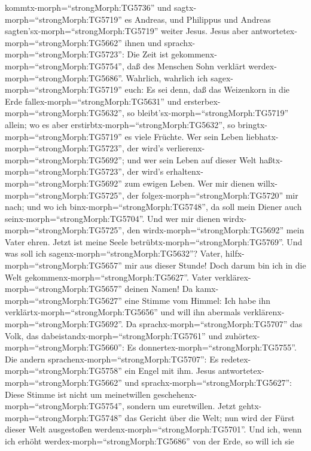 kommtx-morph=``strongMorph:TG5736'' und
sagtx-morph=``strongMorph:TG5719'' es Andreas, und Philippus und Andreas
sagten'sx-morph=``strongMorph:TG5719'' weiter Jesus.  Jesus
aber antwortetex-morph=``strongMorph:TG5662'' ihnen und
sprachx-morph=``strongMorph:TG5723'': Die Zeit ist
gekommenx-morph=``strongMorph:TG5754'', daß des Menschen Sohn verklärt
werdex-morph=``strongMorph:TG5686''.  Wahrlich, wahrlich
ich sagex-morph=``strongMorph:TG5719'' euch: Es sei denn, daß das
Weizenkorn in die Erde fallex-morph=``strongMorph:TG5631'' und
ersterbex-morph=``strongMorph:TG5632'', so
bleibt'sx-morph=``strongMorph:TG5719'' allein; wo es aber
erstirbtx-morph=``strongMorph:TG5632'', so
bringtx-morph=``strongMorph:TG5719'' es viele Früchte.  Wer
sein Leben liebhatx-morph=``strongMorph:TG5723'', der wird's
verlierenx-morph=``strongMorph:TG5692''; und wer sein Leben auf dieser
Welt haßtx-morph=``strongMorph:TG5723'', der wird's
erhaltenx-morph=``strongMorph:TG5692'' zum ewigen Leben. 
Wer mir dienen willx-morph=``strongMorph:TG5725'', der
folgex-morph=``strongMorph:TG5720'' mir nach; und wo ich
binx-morph=``strongMorph:TG5748'', da soll mein Diener auch
seinx-morph=``strongMorph:TG5704''. Und wer mir dienen
wirdx-morph=``strongMorph:TG5725'', den
wirdx-morph=``strongMorph:TG5692'' mein Vater ehren.  Jetzt
ist meine Seele betrübtx-morph=``strongMorph:TG5769''. Und was soll ich
sagenx-morph=``strongMorph:TG5632''? Vater,
hilfx-morph=``strongMorph:TG5657'' mir aus dieser Stunde! Doch darum bin
ich in die Welt gekommenx-morph=``strongMorph:TG5627''. 
Vater verklärex-morph=``strongMorph:TG5657'' deinen Namen! Da
kamx-morph=``strongMorph:TG5627'' eine Stimme vom Himmel: Ich habe ihn
verklärtx-morph=``strongMorph:TG5656'' und will ihn abermals
verklärenx-morph=``strongMorph:TG5692''.  Da
sprachx-morph=``strongMorph:TG5707'' das Volk, das
dabeistandx-morph=``strongMorph:TG5761'' und
zuhörtex-morph=``strongMorph:TG5660'': Es
donnertex-morph=``strongMorph:TG5755''. Die andern
sprachenx-morph=``strongMorph:TG5707'': Es
redetex-morph=``strongMorph:TG5758'' ein Engel mit ihm. 
Jesus antwortetex-morph=``strongMorph:TG5662'' und
sprachx-morph=``strongMorph:TG5627'': Diese Stimme ist nicht um
meinetwillen geschehenx-morph=``strongMorph:TG5754'', sondern um
euretwillen.  Jetzt gehtx-morph=``strongMorph:TG5748'' das
Gericht über die Welt; nun wird der Fürst dieser Welt ausgestoßen
werdenx-morph=``strongMorph:TG5701''.  Und ich, wenn ich
erhöht werdex-morph=``strongMorph:TG5686'' von der Erde, so will ich sie
